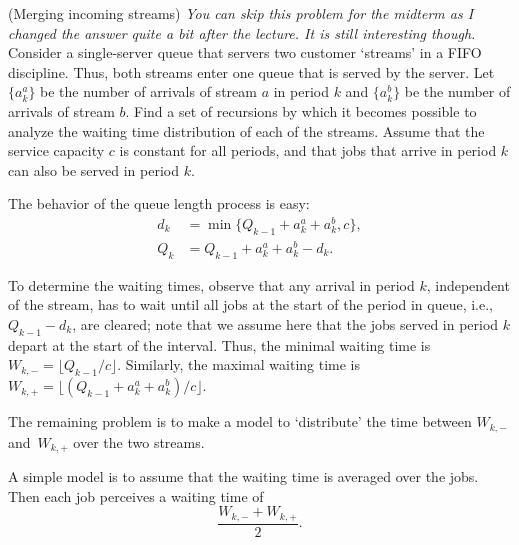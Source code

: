 \begin{question} (Merging incoming streams) \tbd \emph{You can skip
    this problem for the midterm as I changed the answer quite a bit
    after the lecture. It is still interesting though. } Consider a
  single-server queue that servers two customer `streams' in a FIFO
  discipline. Thus, both streams enter one queue that is served by the
  server. Let $\{a_k^a\}$ be the number of arrivals of stream $a$ in
  period $k$ and $\{a_k^b\}$ be the number of arrivals of stream
  $b$. Find a set of recursions by which it becomes possible to
  analyze the waiting time distribution of each of the streams. Assume
  that the service capacity $c$ is constant for all periods, and that
  jobs that arrive in period $k$ can also be served in period $k$.

  \begin{solution}
    The behavior of the queue length  process is easy: 
    \begin{equation*}
      \begin{split}
      d_k &= \min\{Q_{k-1}+a_k^a+a_k^b, c\}, \\
Q_k &= Q_{k-1}+a_k^a + a_k^b - d_k.
      \end{split}
    \end{equation*}

    To determine the waiting times, observe that any arrival in period
    $k$, independent of the stream, has to wait until all jobs at the
    start of the period in queue, i.e., $Q_{k-1}-d_k$, are cleared;
    note that we assume here that the jobs served in period $k$ depart
    at the start of the interval. Thus, the minimal waiting time is
    $W_{k,-} = \lfloor Q_{k-1}/c\rfloor$.  Similarly, the maximal
    waiting time is
    $W_{k,+} = \lfloor (Q_{k-1}+a_k^a + a_k^b) /c\rfloor$.

    The remaining problem is to make a model to `distribute' the
    time between $W_{k,-}$ and~$W_{k,+}$ over the two streams. 

    A simple model is to assume that the waiting time is averaged over
    the jobs. Then each job perceives a waiting time of
    \begin{equation*}
      \frac{W_{k,-} + W_{k,+}}2.
    \end{equation*}


\end{solution}
\end{question}

